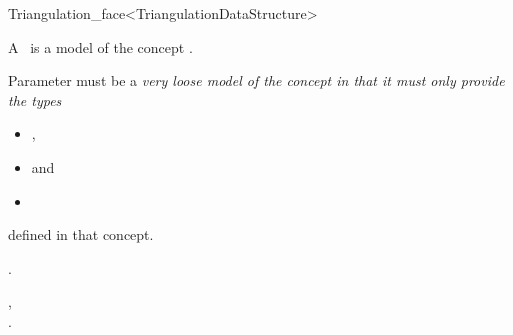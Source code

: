 \begin{ccRefClass}{Triangulation_face<TriangulationDataStructure>}

\ccDefinition

A \ccRefName\ is a model of the concept .

\ccParameters

Parameter  must be a \em{very loose} model of the concept
 in that it must only provide the
types\begin{itemize}
\item {},
\item {} and
\item {}\end{itemize} defined in that concept.


\ccIsModel

.

\ccSeeAlso

,\\
.

\end{ccRefClass}

